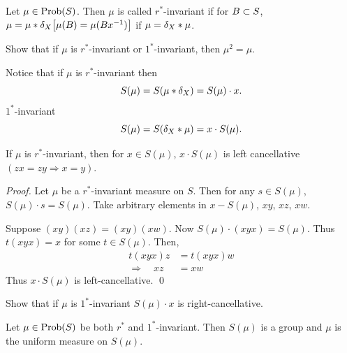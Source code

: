 \begin{definition}   \label{defn:}
Let $\mu \in \hbox{Prob}(S)$.  
Then $\mu$ is called $r^*$-invariant if for $B \subset S$, $\mu = \mu * \delta_X \big[ \mu(B) = \mu(Bx^{-1}) \big]$ if $\mu = \delta_X * \mu$.
\end{definition}


 Show that if $\mu$ is $r^*$-invariant or $1^*$-invariant, then $\mu^2 = \mu$.

Notice that if $\mu$ is $r^*$-invariant then
\[
     S(\mu) = S(\mu * \delta_X) = S(\mu) \cdot x.
\]
$1^*$-invariant
\[
     S(\mu) = S(\delta_X *\mu) = x \cdot S(\mu) .
\]

\begin{lemma} 		\label{lem:3.2} 
If $\mu$ is $r^*$-invariant, then for $x \in S(\mu)$, $x \cdot S(\mu)$ is left cancellative $(zx = zy \Rightarrow x = y)$.
\end{lemma}

\begin{proof} Let $\mu$ be a $r^*$-invariant measure on $S$.
Then for any $s \in S(\mu)$, $S(\mu) \cdot s = S(\mu)$.  
Take arbitrary elements in $x-S(\mu)$, $xy$, $xz$, $xw$.

Suppose $(xy)(xz) = (xy)(xw)$.  Now $S(\mu) \cdot (xyx) = S(\mu)$.  
Thus $t(xyx) = x$ for some $t \in S(\mu)$.  
Then,
\[
\begin{aligned}
       t(xyx)z &= t(xyx)w                                      \\
       \Rightarrow \quad xz &= xw
\end{aligned}
\]
Thus $x \cdot S(\mu)$ is left-cancellative.
\qed
\end{proof}

 Show that if $\mu$ is $1^*$-invariant $S(\mu) \cdot x$ is right-cancellative.

\begin{lemma}		\label{lem:3.3}  
Let $\mu \in \hbox{Prob}(S)$ be both $r^*$ and $1^*$-invariant.  
Then $S(\mu)$ is a group and $\mu$ is the uniform measure on $S(\mu)$.
\end{lemma}

